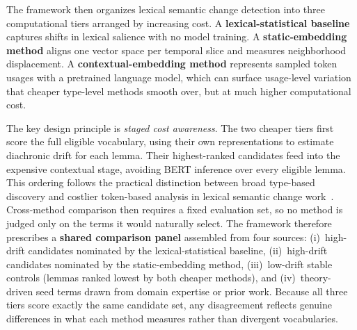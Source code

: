 \documentclass[12pt]{article}
\begin{document}
The framework then organizes lexical semantic change detection into three computational tiers arranged by increasing cost. A \textbf{lexical-statistical baseline} captures shifts in lexical salience with no model training. A \textbf{static-embedding method} aligns one vector space per temporal slice and measures neighborhood displacement. A \textbf{contextual-embedding method} represents sampled token usages with a pretrained language model, which can surface usage-level variation that cheaper type-level methods smooth over, but at much higher computational cost.

The key design principle is \emph{staged cost awareness}. %
The two cheaper tiers first score the full eligible vocabulary, using their own representations to estimate diachronic drift for each lemma. Their highest-ranked candidates feed into the expensive contextual stage, avoiding BERT inference over every eligible lemma. This ordering follows the practical distinction between broad type-based discovery and costlier token-based analysis in lexical semantic change work~\cite{kurtyigit-etal-2021-lexical}. Cross-method comparison then requires a fixed evaluation set, so no method is judged only on the terms it would naturally select.
The framework therefore prescribes a
\textbf{shared comparison panel} assembled from four sources: (i)~high-drift
candidates nominated by the lexical-statistical baseline, (ii)~high-drift candidates nominated by the static-embedding method, 
(iii)~low-drift stable controls (lemmas ranked lowest by both cheaper methods),
and (iv)~theory-driven seed
terms drawn from domain expertise or prior work. Because all three tiers score
exactly the same candidate set, any disagreement reflects genuine differences
in what each method measures rather than divergent vocabularies.
\end{document}
